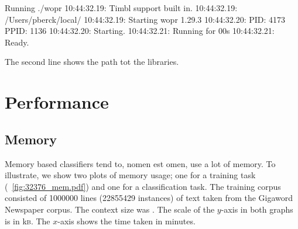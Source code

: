 \documentclass[a4paper,10pt,twoside]{report}
\begin{document}
\begin{bash}{Running \wopr{}}
./wopr
10:44:32.19: Timbl support built in.
10:44:32.19: /Users/pberck/local/
10:44:32.19: Starting wopr 1.29.3
10:44:32.20: PID:   4173 PPID:   1136
10:44:32.20: Starting.
10:44:32.21: Running for 00s
10:44:32.21: Ready.
\end{bash}

The second line shows the path tot the \Timbl{} libraries.

\chapter{Performance}

\section{Memory}

Memory based classifiers tend to, nomen est omen, use a lot of
memory. To illustrate, we show two plots of memory usage; one for a
training task (\figurename~\ref{fig:32376_mem.pdf}) and one for a
classification task. The training corpus consisted of \num{1000000}
lines (\num{22855429} instances) of text taken from the Gigaword
Newspaper corpus. The context size was . The scale of the
$y$-axis in both graphs is in k\textsc{b}. The $x$-axis shows the time
taken in minutes.
\end{document}
